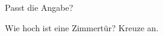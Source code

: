 \setcounter{aufgabe}{13}

\begin{aufgabe}{Passt die Angabe?}
\begin{teile}
\teil Wie hoch ist eine Zimmertür? Kreuze an.\\ \\ \\ 
\end{teile}
\end{aufgabe}

